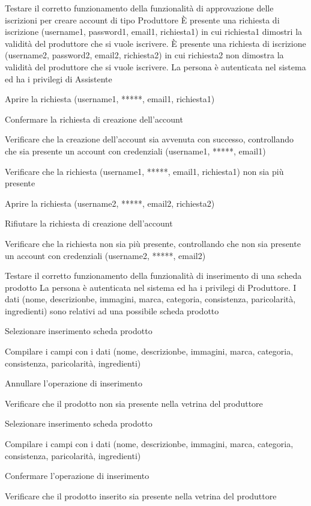 {Testare il corretto funzionamento della funzionalità di approvazione delle iscrizioni per creare account di tipo Produttore}
{È presente una richiesta di iscrizione (username1, password1, email1, richiesta1) in cui richiesta1 dimostri la validità del produttore che si vuole iscrivere. È presente una richiesta di iscrizione (username2, password2, email2, richiesta2) in cui richiesta2 non dimostra la validità del produttore che si vuole iscrivere. La persona è autenticata nel sistema ed ha i privilegi di Assistente}
{\begin{enumCU}
    \item Aprire la richiesta (username1, *****, email1, richiesta1)
    \item Confermare la richiesta di creazione dell'account
    \item Verificare che la creazione dell'account sia avvenuta con successo, controllando che sia presente un account con credenziali (username1, *****, email1)
    \item Verificare che la richiesta (username1, *****, email1, richiesta1) non sia più presente
    \item Aprire la richiesta (username2, *****, email2, richiesta2)
    \item Rifiutare la richiesta di creazione dell'account 
    \item Verificare che la richiesta non sia più presente, controllando che non sia presente un account con credenziali (username2, *****, email2)
\end{enumCU}}


{Testare il corretto funzionamento della funzionalità di inserimento di una scheda prodotto}
{La persona è autenticata nel sistema ed ha i privilegi di Produttore. I dati (nome, descrizionbe, immagini, marca, categoria, consistenza, paricolarità, ingredienti) sono relativi ad una possibile scheda prodotto}
{\begin{enumCU}
    \item Selezionare inserimento scheda prodotto
    \item Compilare i campi con i dati (nome, descrizionbe, immagini, marca, categoria, consistenza, paricolarità, ingredienti)
    \item Annullare l'operazione di inserimento
    \item Verificare che il prodotto non sia presente nella vetrina del produttore
    \item Selezionare inserimento scheda prodotto
    \item Compilare i campi con i dati (nome, descrizionbe, immagini, marca, categoria, consistenza, paricolarità, ingredienti)
    \item Confermare l'operazione di inserimento
    \item Verificare che il prodotto inserito sia presente nella vetrina del produttore
\end{enumCU}}

